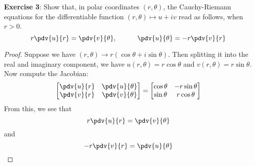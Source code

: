 \documentclass{article}
\begin{document}
\textbf{Exercise 3}: Show that, in polar coordinates $(r, \theta)$, the Cauchy-Riemann equations for the differentiable function $(r, \theta) \mapsto u + iv$ read as follows, when $r > 0$.
    \begin{equation*}
        r \pdv{u}{r} = \pdv{v}{\theta}, \hspace{30pt} \pdv{u}{\theta} = -r \pdv{v}{r}
    \end{equation*}
    \begin{proof}
        Suppose we have $(r, \theta) \rightarrow r(\cos{\theta} + i\sin{\theta})$. Then splitting it into the real and imaginary component, we have $u(r, \theta) = r\cos{\theta}$ and $v(r, \theta) = r\sin{\theta}$. Now compute the Jacobian:
            \begin{equation*}
                \begin{bmatrix}
                    \pdv{u}{r} & \pdv{u}{\theta} \\
                    \pdv{v}{r} & \pdv{v}{\theta}   
                \end{bmatrix} = \begin{bmatrix}
                    \cos{\theta} & -r\sin{\theta} \\
                    \sin{\theta} & r\cos{\theta}    
                \end{bmatrix}
            \end{equation*}
        From this, we see that 
            \begin{equation*}
                r\pdv{u}{r} = \pdv{v}{\theta}
            \end{equation*}
        and
            \begin{equation*}
                -r\pdv{v}{r} = \pdv{u}{\theta}
            \end{equation*}
    \end{proof}
\end{document}
